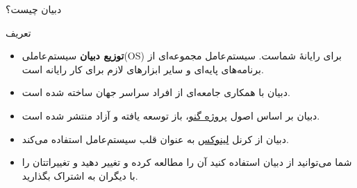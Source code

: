 \documentclass[hyperref={colorlinks}]{beamer}
\begin{document}
\begin{persian}
\begin{frame}{دبیان چیست؟}
\begin{block}{تعریف}
\begin{itemize}		

		\item \textbf{{توزیع دبیان}} 
سیستم‌عاملی(OS) برای رایانهٔ شماست. 
سیستم‌عامل مجموعه‌ای از برنامه‌های پایه‌ای و سایر ابزارهای لازم برای کار رایانه است. 
		
		\item 
دبیان با همکاری جامعه‌ای از افراد سراسر جهان ساخته شده است.

		\item 
دبیان بر اساس اصول  \href{http://www.gnu.org}{پروژه گنو}، باز توسعه یافته و آزاد منتشر شده است.

	    \item 
دبیان از کرنل \href{http://www.linux.org}{لینوکس} به عنوان قلب سیستم‌عامل استفاده می‌کند.
        \item 
شما می‌توانید از دبیان استفاده‌ کنید آن را مطالعه کرده و تغییر دهید و تغییراتتان را با دیگران به اشتراک بگذارید.

\end{itemize}
\end{block}
\end{frame}
\end{persian}

\end{document}
